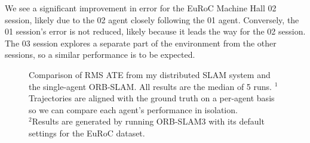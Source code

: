 We see a significant improvement in error for the EuRoC Machine Hall 02 session, likely due to the 02 agent closely following the 01 agent. Conversely, the 01 session's error is not reduced, likely because it leads the way for the 02 session. The 03 session explores a separate part of the environment from the other sessions, so a similar performance is to be expected.

\begin{figure}[h]
    \captionsetup{format=plain}
    \begin{minipage}[c]{0.48\textwidth}
        \caption{Comparison of RMS ATE from my distributed SLAM system and the single-agent ORB-SLAM. All results are the median of 5 runs. \captionbreak $^1$Trajectories are aligned with the ground truth on a per-agent basis so we can compare each agent's performance in isolation. \\ $^2$Results are generated by running ORB-SLAM3 with its default settings for the EuRoC dataset.}
        \label{fig:comparison-to-single-agent-systems}
    \end{minipage}\hfill
    \begin{minipage}[c]{0.5\textwidth}
        \centering

    \end{minipage}
\end{figure}


